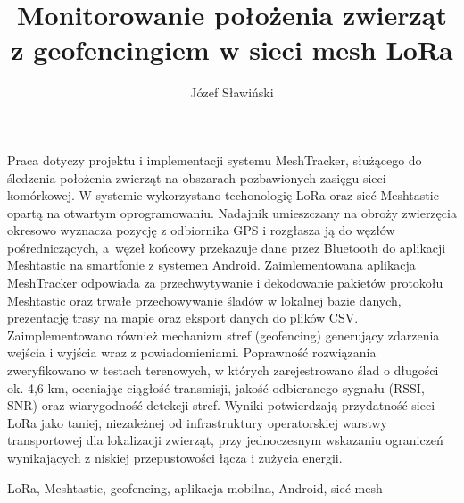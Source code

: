 \documentclass[
    left=2.5cm,         %
    right=2.5cm,        %
    top=2.5cm,          %
    bottom=3cm,         %
    bindingoffset=6mm,  %
    nohyphenation=false %
]{eiti/eiti-thesis}
\begin{document}
\EngineerThesis
{}
\title{
Monitorowanie położenia zwierząt z geofencingiem w sieci mesh LoRa}
\author{Józef Sławiński}
\date{\the\year}
\maketitle

\cleardoublepage %
\streszczenie
Praca dotyczy projektu i implementacji systemu MeshTracker, służącego do śledzenia położenia zwierząt na obszarach 
pozbawionych zasięgu sieci komórkowej. W systemie wykorzystano techonologię LoRa oraz sieć Meshtastic opartą na otwartym oprogramowaniu. 
Nadajnik umieszczany na obroży zwierzęcia okresowo wyznacza pozycję z odbiornika GPS i rozgłasza ją do węzłów pośredniczących, a~węzeł
końcowy przekazuje dane przez Bluetooth do aplikacji Meshtastic na smartfonie z systemen Android. Zaimlementowana aplikacja MeshTracker 
odpowiada za przechwytywanie i dekodowanie pakietów protokołu Meshtastic oraz trwałe przechowywanie śladów w lokalnej bazie danych, 
prezentację trasy na mapie oraz eksport danych do plików CSV. Zaimplementowano również mechanizm stref (geofencing) generujący 
zdarzenia wejścia i wyjścia wraz z powiadomieniami. Poprawność rozwiązania zweryfikowano w testach terenowych, w których zarejestrowano 
ślad o długości ok. 4,6 km, oceniając ciągłość transmisji, jakość odbieranego sygnału (RSSI, SNR) oraz wiarygodność detekcji stref. 
Wyniki potwierdzają przydatność sieci LoRa jako taniej, niezależnej od infrastruktury operatorskiej warstwy transportowej dla 
lokalizacji zwierząt, przy jednoczesnym wskazaniu ograniczeń wynikających z niskiej przepustowości łącza i zużycia energii.
 
\slowakluczowe LoRa, Meshtastic, geofencing, aplikacja mobilna, Android, sieć mesh
\end{document}
